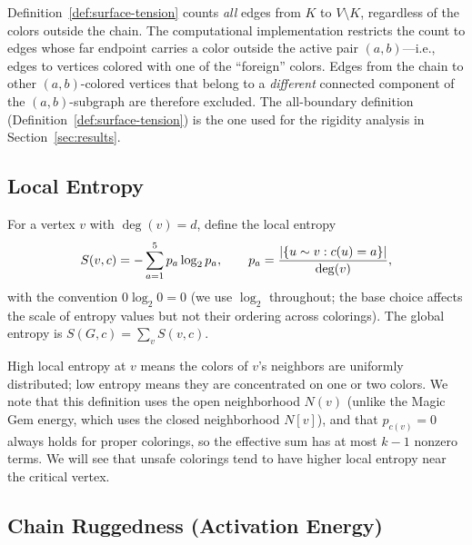 \begin{remark}\label{rem:st-boundary}
Definition~\ref{def:surface-tension} counts \emph{all} edges from $K$
to $V \setminus K$, regardless of the colors outside the chain. The
computational implementation restricts the count to edges whose
far endpoint carries a color outside the active pair $(a,b)$---i.e.,
edges to vertices colored with one of the ``foreign'' colors.
Edges from the chain to other $(a,b)$-colored vertices that belong to a
\emph{different} connected component of the $(a,b)$-subgraph are
therefore excluded. The all-boundary definition
(Definition~\ref{def:surface-tension}) is the one used for the rigidity
analysis in Section~\ref{sec:results}.
\end{remark}

\subsection{Local Entropy}\label{sec:entropy}

\begin{definition}\label{def:entropy}
For a vertex $v$ with $\deg(v) = d$, define the local entropy
\begin{equation}\label{eq:entropy}
  S(v, c) = -\sum_{a=1}^{5} p_a \log_2 p_a,
  \qquad
  p_a = \frac{\lvert \{u \sim v : c(u) = a\} \rvert}{\deg(v)},
\end{equation}
with the convention $0 \log_2 0 = 0$ (we use $\log_2$ throughout; the
base choice affects the scale of entropy values but not their ordering
across colorings). The global entropy is $S(G, c) = \sum_v S(v, c)$.
\end{definition}

High local entropy at $v$ means the colors of $v$'s neighbors are
uniformly distributed; low entropy means they are concentrated on one
or two colors. We note that this definition uses the open neighborhood
$N(v)$ (unlike the Magic Gem energy, which uses the closed
neighborhood $N[v]$), and that $p_{c(v)} = 0$ always holds for proper
colorings, so the effective sum has at most $k - 1$ nonzero terms.
We will see that unsafe colorings tend to have higher local entropy
near the critical vertex.

\subsection{Chain Ruggedness (Activation Energy)}
\label{sec:ruggedness}

